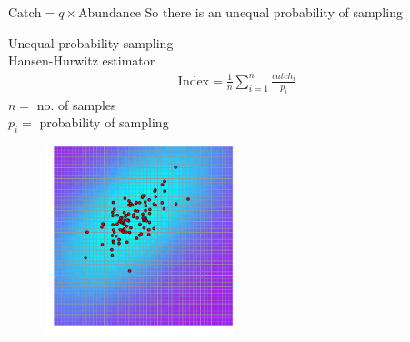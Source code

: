 \documentclass{beamer}
\begin{document}
\begin{frame}{$\text{Catch} = q \times \text{Abundance}$}
So there is an unequal probability of sampling\\
\begin{minipage}{0.4\textwidth}
  \begin{flushleft}
    Unequal probability sampling \\
    Hansen-Hurwitz estimator\\    
    \begin{align*}
      \text{Index} = \frac{1}{n} \sum_{i=1}^n \frac{catch_i}{p_i}  
    \end{align*}
    $n =$ no. of samples \\
    $p_i =$ probability of sampling
  \end{flushleft}
\end{minipage}
\hspace{0.5cm}
\begin{minipage}{0.4\textwidth}
  \begin{figure}
    \centering
    \includegraphics[width=5.5cm]{fig3}
  \end{figure}
\end{minipage}
\end{frame}
\end{document}

